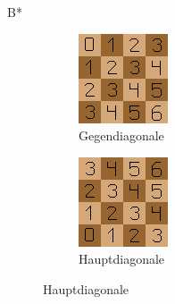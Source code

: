\documentclass[aspectratio=43,t]{beamer}
\begin{document}
\begin{frame}{B*}
\begin{figure}[h!]
\begin{subfigure}{0.3\linewidth}
          \includegraphics[width=\linewidth]{../img/left_diagonals.png}
          \caption{Gegendiagonale}
        \end{subfigure}
        \begin{subfigure}{0.3\linewidth}
          \includegraphics[width=\linewidth]{../img/right_diagonals.png}
          \caption{Hauptdiagonale}
        \end{subfigure}
        \label{arrays}
      \end{figure}
    \end{frame}
\end{document}
